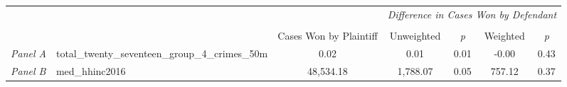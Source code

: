 \begin{tabular}{llccccc}
\toprule
 &  & \textit{} & \multicolumn{4}{c}{\textit{Difference in Cases Won by Defendant}} \\
\cline{4-7}
\\
 &  & Cases Won by Plaintiff & Unweighted & \emph{p} & Weighted & \emph{p} \\
\midrule
\textit{Panel A} & total_twenty_seventeen_group_4_crimes_50m & 0.02 & 0.01 & 0.01 & -0.00 & 0.43 \\
\cline{1-7}
\textit{Panel B} & med_hhinc2016 & 48,534.18 & 1,788.07 & 0.05 & 757.12 & 0.37 \\
\cline{1-7}
\bottomrule
\end{tabular}
